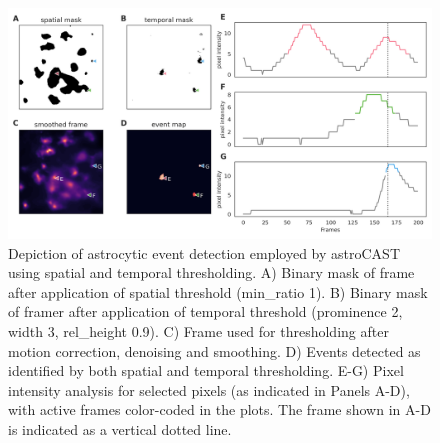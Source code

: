 \documentclass[utf8]{FrontiersinHarvard}
\begin{document}
    \begin{figure}[!htb]
        \begin{center}
            \includegraphics[width=\linewidth]{figures/5}
        \end{center}
        \caption{
            Depiction of astrocytic event detection employed by astroCAST using spatial and temporal thresholding. A) Binary mask of frame after application of spatial threshold (min\_ratio 1). B) Binary mask of framer after application of temporal threshold (prominence 2, width 3, rel\_height 0.9). C) Frame used for thresholding after motion correction, denoising and smoothing. D) Events detected as identified by both spatial and temporal thresholding. E-G) Pixel intensity analysis for selected pixels (as indicated in Panels A-D), with active frames color-coded in the plots. The frame shown in A-D is indicated as a vertical dotted line.
        }\label{fig:5}
    \end{figure}
\end{document}
